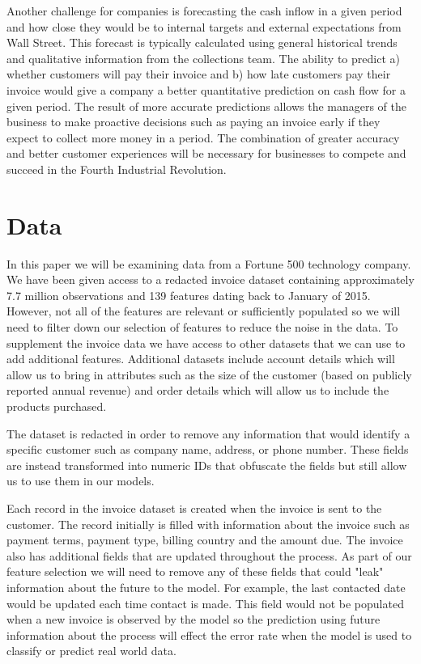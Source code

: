 \documentclass{article}
\begin{document}
\par
Another challenge for companies is forecasting the cash inflow in a given period and how close they would be to internal targets and external expectations from Wall Street. This forecast is typically calculated using general historical trends and qualitative information from the collections team. The ability to predict a) whether customers will pay their invoice and b) how late customers pay their invoice would give a company a better quantitative prediction on cash flow for a given period.  The result of more accurate predictions allows the managers of the business to make proactive decisions such as paying an invoice early if they expect to collect more money in a period. The combination of greater accuracy and better customer experiences will be necessary for businesses to compete and succeed in the Fourth Industrial Revolution.


\section{Data}
In this paper we will be examining data from a Fortune 500 technology company.  We have been given access to a redacted invoice dataset containing approximately 7.7 million observations and 139 features dating back to January of 2015.  However, not all of the features are relevant or sufficiently populated so we will need to filter down our selection of features to reduce the noise in the data. To supplement the invoice data we have access to other datasets that we can use to add additional features.  Additional datasets include account details which will allow us to bring in attributes such as the size of the customer (based on publicly reported annual revenue) and order details which will allow us to include the products purchased.  
\par
The dataset is redacted in order to remove any information that would identify a specific customer such as company name, address, or phone number.  These fields are instead transformed into numeric IDs that obfuscate the fields but still allow us to use them in our models. 
\par
Each record in the invoice dataset is created when the invoice is sent to the customer. The record initially is filled with information about the invoice such as payment terms, payment type, billing country and the amount due.  The invoice also has additional fields that are updated throughout the process.  As part of our feature selection we will need to remove any of these fields that could "leak" information about the future to the model.  For example, the last contacted date would be updated each time contact is made.  This field would not be populated when a new invoice is observed by the model so the prediction using future information about the process will effect the error rate when the model is used to classify or predict real world data. 
\end{document}
